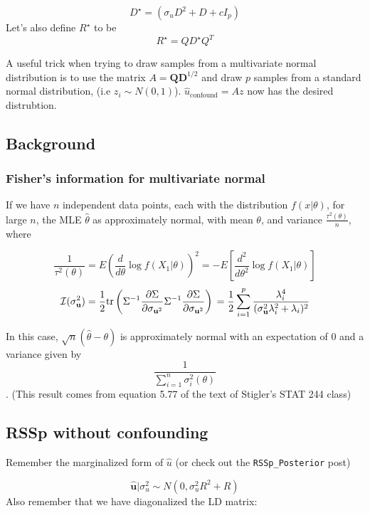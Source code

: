 {$$D^{\star}=(\sigma_uD^2+D+c I_p)$$
Let's also define \(R^\star\) to be 
$$R^\star=Q D^{\star}Q^{T}$$

A useful trick when trying to draw samples from a multivariate normal distribution
is to use the matrix \(A=\textbf{Q}\textbf{D}^{1/2}\) and  draw \(p\) samples from a standard normal distribution, (i.e \(z_i \sim N(0,1)\)).  \(\hat{u}_{\text{confound}}=Az\) now has the desired distrubtion.




\subsection{Background}\label{sec:org13cff0e}

\subsubsection{Fisher's information for multivariate normal}\label{sec:orgc6a5fb9}

If we have \(n\) independent data points, each with the distribution \(f(x|\theta)\), for large \(n\), the MLE \(\hat{\theta}\) as approximately normal, with mean \(\theta\), and variance \(\frac{\tau^2(\theta)}{n}\), where 

$$ \frac{1}{\tau^2(\theta)}=E \left( \frac{d}{d \theta} \log f(X_1|\theta) \right)^2 = -E \left[ \frac{d^2}{d\theta^2} \log f(X_1|\theta) \right]$$
$$\mathcal{I}(\sigma_\textbf{u}^2)=\frac{1}{2}\text{tr}\left( \Sigma^{-1} \frac{\partial  \Sigma}{\partial \sigma_{\textbf{u}^2}}  \Sigma^{-1} \frac{\partial  \Sigma}{\partial \sigma_{\textbf{u}^2}} \right) \\ 
=\frac{1}{2}\sum_{i=1}^p \frac{\lambda_i^4}{(\sigma_\textbf{u}^2 \lambda_i^2+\lambda_i)^2} $$

In this case, \(\sqrt{n}(\hat{\theta}-\theta)\) is approximately normal with an expectation of \(0\)  and a variance given by $$\frac{1}{\sum_{i=1}^n \sigma_i^2(\theta)}$$.  (This result comes from equation 5.77 of the text of Stigler's STAT 244 class)



\subsection{RSSp without confounding}\label{sec:org68d2164}

Remember the marginalized form of \(\hat{u}\) (or check out the \texttt{RSSp\_Posterior} post)

$$ \hat{\textbf{u}}|\sigma_u^2 \sim N(0,\sigma_u^2R^2+R)$$
Also remember that we have diagonalized the LD matrix:

}

